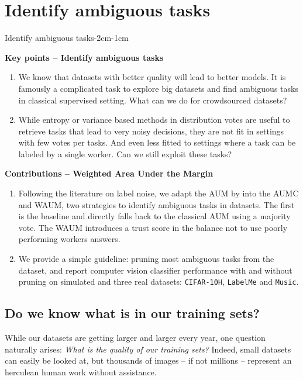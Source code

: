 \chapter{Identify ambiguous tasks}
\enlargethispage{3\baselineskip}

\begin{keypointstwomargins}{Identify ambiguous tasks}{-2cm}{-1cm}

        \textbf{Key points -- Identify ambiguous tasks}
        \begin{enumerate}[leftmargin=*]
        \item We know that datasets with better quality will lead to better models. It is famously a complicated task to explore big datasets and find ambiguous tasks in classical supervised setting. What can we do for crowdsourced datasets?
        \item While entropy or variance based methods in distribution votes are useful to retrieve tasks that lead to very noisy decisions, they are not fit in settings with few votes per tasks. And even less fitted to settings where a task can be labeled by a single worker. Can we still exploit these tasks?
        \end{enumerate}

        \textbf{Contributions -- Weighted Area Under the Margin}
        \begin{enumerate}[leftmargin=*,start=3]
        \item Following the literature on label noise, we adapt the AUM by \citet{pleiss_identifying_2020} into the AUMC and WAUM, two strategies to identify ambiguous tasks in datasets. The first is the baseline and directly falls back to the classical AUM using a majority vote. The WAUM introduces a trust score in the balance not to use poorly performing workers answers.
        \item We provide a simple guideline: pruning most ambiguous tasks from the dataset, and report computer vision classifier performance with and without pruning on simulated and three real datasets: \texttt{CIFAR-10H}, \texttt{LabelMe} and \texttt{Music}.
        \end{enumerate}

\end{keypointstwomargins}

\section{Do we know what is in our training sets?}
While our datasets are getting larger and larger every year, one question naturally arises: \emph{What is the quality of our training sets?}
Indeed, small datasets can easily be looked at, but thousands of images -- if not millions -- represent an herculean human work without assistance.


